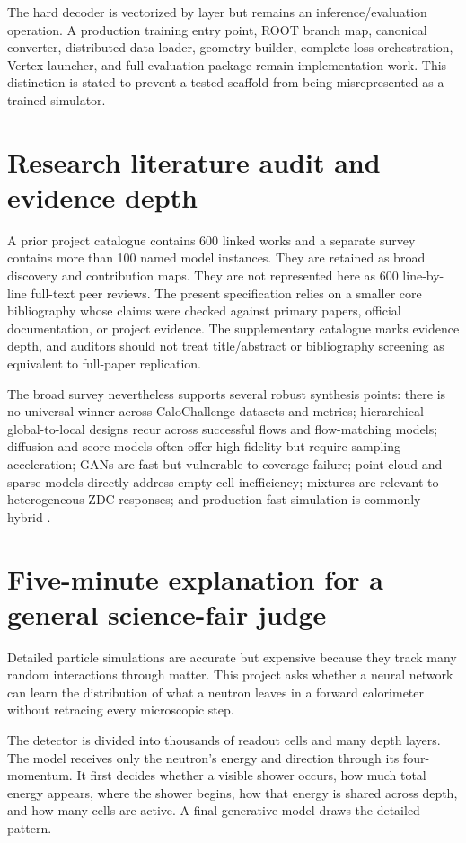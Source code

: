 \documentclass[11pt]{article}
\theoremstyle{definition}
\theoremstyle{remark}
\begin{document}
The hard decoder is vectorized by layer but remains an inference/evaluation operation. A production training entry point, ROOT branch map, canonical converter, distributed data loader, geometry builder, complete loss orchestration, Vertex launcher, and full evaluation package remain implementation work. This distinction is stated to prevent a tested scaffold from being misrepresented as a trained simulator.

\section{Research literature audit and evidence depth}
A prior project catalogue contains 600 linked works and a separate survey contains more than 100 named model instances. They are retained as broad discovery and contribution maps. They are not represented here as 600 line-by-line full-text peer reviews. The present specification relies on a smaller core bibliography whose claims were checked against primary papers, official documentation, or project evidence. The supplementary catalogue marks evidence depth, and auditors should not treat title/abstract or bibliography screening as equivalent to full-paper replication.

The broad survey nevertheless supports several robust synthesis points: there is no universal winner across CaloChallenge datasets and metrics; hierarchical global-to-local designs recur across successful flows and flow-matching models; diffusion and score models often offer high fidelity but require sampling acceleration; GANs are fast but vulnerable to coverage failure; point-cloud and sparse models directly address empty-cell inefficiency; mixtures are relevant to heterogeneous ZDC responses; and production fast simulation is commonly hybrid \citep{calochallenge,caloflow2,calodream,calodiffusion,caloscore2,caloclouds2,expertsim,atlfast3}.

\section{Five-minute explanation for a general science-fair judge}
Detailed particle simulations are accurate but expensive because they track many random interactions through matter. This project asks whether a neural network can learn the distribution of what a neutron leaves in a forward calorimeter without retracing every microscopic step.

The detector is divided into thousands of readout cells and many depth layers. The model receives only the neutron's energy and direction through its four-momentum. It first decides whether a visible shower occurs, how much total energy appears, where the shower begins, how that energy is shared across depth, and how many cells are active. A final generative model draws the detailed pattern.
\end{document}
